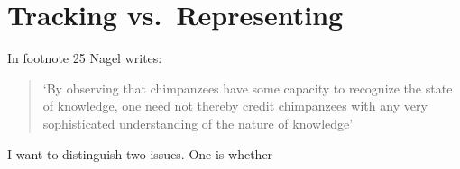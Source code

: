 \documentclass[11pt,a4paper]{extarticle}
\begin{document}
\section{Tracking vs.\ Representing}




In footnote 25 Nagel writes:
%
\begin{quote}
`By observing that chimpanzees have some capacity to recognize the state of knowledge, one need not thereby credit chimpanzees with any very sophisticated understanding of the nature of knowledge'
\end{quote}
%
I want to distinguish two issues.
One is whether 





\end{document}

